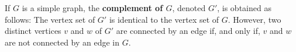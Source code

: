 \documentclass[../mathNotesPreamble]{subfiles}
\begin{document}
  \begin{defn*}
    If $G$ is a simple graph, the \textbf{complement of $G$}, denoted $G'$, is obtained as follows: The vertex set of $G'$ is identical to the vertex set of $G$. However, two distinct vertices $v$ and $w$ of $G'$ are connected by an edge if, and only if, $v$ and $w$ are not connected by an edge in $G$.
  \end{defn*}

  \pagebreak
\end{document}
